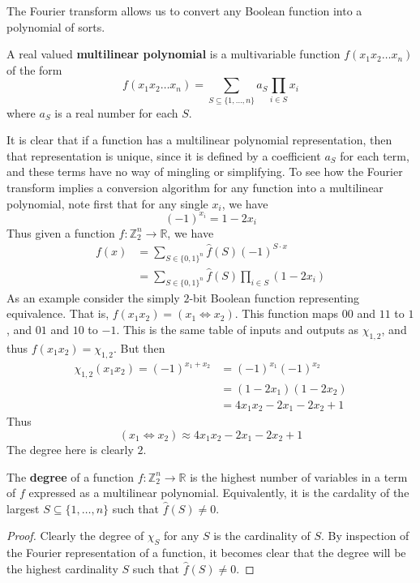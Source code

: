The Fourier transform allows us to convert any Boolean function into a polynomial of sorts.
\begin{definition}
	A real valued \textbf{multilinear polynomial} is a multivariable function $f(x_1 x_2 \ldots x_n)$ of the form
	\[ f(x_1 x_2 \ldots x_n) = \sum_{S \subseteq \{1,\ldots,n\}} a_S \prod_{i \in S} x_i \]
	where $a_S$ is a real number for each $S$.
\end{definition}
It is clear that if a function has a multilinear polynomial representation, then that representation is unique, since it is defined by a coefficient $a_S$ for each term, and these terms have no way of mingling or simplifying. To see how the Fourier transform implies a conversion algorithm for any function into a multilinear polynomial, note first that for any single $x_i$, we have
\[ (-1)^{x_i} = 1-2x_i \]
Thus given a function $f:\mathbb{Z}_2^n \to \mathbb{R}$, we have
\begin{align}
	f(x) &= \sum_{S \in \{0,1\}^n} \hat{f}(S)(-1)^{S \cdot x} \\
		&= \sum_{S \in \{0,1\}^n} \hat{f}(S)\prod_{i \in S} (1-2x_i)
\end{align}
As an example consider the simply $2$-bit Boolean function representing equivalence. That is, $f(x_1 x_2) = (x_1 \iff x_2)$. This function maps $00$ and $11$ to $1$, and $01$ and $10$ to $-1$. This is the same table of inputs and outputs as $\chi_{1,2}$, and thus $f(x_1x_2) = \chi_{1,2}$. But then
\begin{align}
	\chi_{1,2}(x_1x_2) = (-1)^{x_1 + x_2} &= (-1)^{x_1}(-1)^{x_2} \\ &= (1-2x_1)(1-2x_2) \\ &= 4x_1x_2 -2x_1 - 2x_2 + 1
\end{align} 
Thus 
\[ (x_1 \iff x_2) \approx 4x_1x_2 -2x_1 - 2x_2 + 1 \]
The degree here is clearly $2$. 
\begin{fact}
	The \textbf{degree} of a function $f: \mathbb{Z}_2^n \to \mathbb{R}$ is the highest number of variables in a term of $f$ expressed as a multilinear polynomial. Equivalently, it is the cardality of the largest $S \subseteq \{1,\ldots,n\}$ such that $\hat{f}(S) \neq 0$.
\end{fact}
\begin{proof}
	Clearly the degree of $\chi_S$ for any $S$ is the cardinality of $S$. By inspection of the Fourier representation of a function, it becomes clear that the degree will be the highest cardinality $S$ such that $\hat{f}(S) \neq 0$. 
\end{proof}
